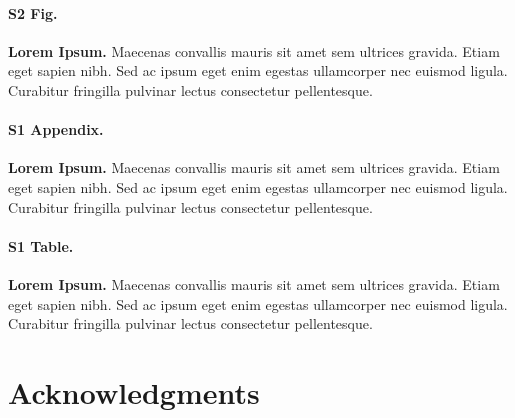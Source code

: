 \documentclass[10pt,letterpaper]{article}
\begin{document}
\paragraph*{S2 Fig.}
\label{S2_Fig}
{\bf Lorem Ipsum.} Maecenas convallis mauris sit amet sem ultrices gravida. Etiam eget sapien nibh. Sed ac ipsum eget enim egestas ullamcorper nec euismod ligula. Curabitur fringilla pulvinar lectus consectetur pellentesque.

\paragraph*{S1 Appendix.}
\label{S1_Appendix}
{\bf Lorem Ipsum.} Maecenas convallis mauris sit amet sem ultrices gravida. Etiam eget sapien nibh. Sed ac ipsum eget enim egestas ullamcorper nec euismod ligula. Curabitur fringilla pulvinar lectus consectetur pellentesque.

\paragraph*{S1 Table.}
\label{S1_Table}
{\bf Lorem Ipsum.} Maecenas convallis mauris sit amet sem ultrices gravida. Etiam eget sapien nibh. Sed ac ipsum eget enim egestas ullamcorper nec euismod ligula. Curabitur fringilla pulvinar lectus consectetur pellentesque.

\section*{Acknowledgments} %

\nolinenumbers
 
\end{document}
